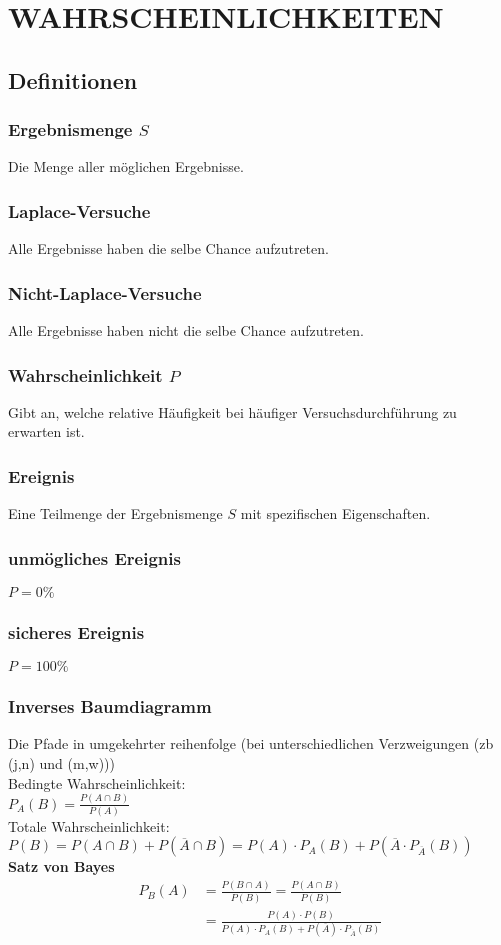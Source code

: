 \documentclass[a4paper,12pt]{article}
\begin{document}
\section{WAHRSCHEINLICHKEITEN}
\subsection{Definitionen}
\subsubsection{Ergebnismenge $S$}
Die Menge aller möglichen Ergebnisse.
\subsubsection{Laplace-Versuche}
Alle Ergebnisse haben die selbe Chance aufzutreten.
\subsubsection{Nicht-Laplace-Versuche}
Alle Ergebnisse haben nicht die selbe Chance aufzutreten.
\subsubsection{Wahrscheinlichkeit $P$}
Gibt an, welche relative Häufigkeit bei häufiger Versuchsdurchführung zu erwarten ist.
\subsubsection{Ereignis}
Eine Teilmenge der Ergebnismenge $S$ mit spezifischen Eigenschaften.
\subsubsection{unmögliches Ereignis}
$P = 0 \%$ 
\subsubsection{sicheres Ereignis}
$P = 100 \%$ 
\pagebreak
\subsubsection{Inverses Baumdiagramm}
Die Pfade in umgekehrter reihenfolge (bei unterschiedlichen Verzweigungen (zb (j,n) und (m,w)))\\
Bedingte Wahrscheinlichkeit:\\
$P_A(B) = \frac{P(A \cap B)}{P(A)}$\\
Totale Wahrscheinlichkeit:\\
$P(B) = P(A \cap B) + P(\overline{A} \cap B) = P(A) \cdot P_A(B) + P(\overline{A} \cdot P_{\overline{A}}(B))$\\
\textbf{Satz von Bayes}\\
\begin{equation}
\begin{split}
P_B(A) & = \frac{P(B \cap A)}{P(B)} = \frac{P(A \cap B)}{P(B)}\\
\ \ \ \ \ & = \frac{P(A) \cdot P(B)}{P(A) \cdot P_A(B) + P(\overline{A}) \cdot P_{\overline{A}}(B)}
\end{split}
\end{equation}
\end{document}
